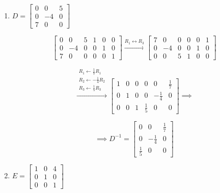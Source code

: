 \begin{enumerate}[label=\alph*)]
\item
$D=
\begin{bmatrix}
    0 & 0 & 5\\
    0 & -4 & 0\\
    7 & 0 & 0
\end{bmatrix}
$

\begin{answer}
    $$
    \left[
    \begin{array}{ccc|ccc}
        0 & 0 & 5 & 1 & 0 & 0\\
        0 & -4 & 0 & 0 & 1 & 0\\
        7 & 0 & 0 & 0 & 0 & 1
    \end{array}
    \right]
    \xrightarrow{R_1\leftrightarrow R_3}
    \left[
    \begin{array}{ccc|ccc}
        7 & 0 & 0 & 0 & 0 & 1\\
        0 & -4 & 0 & 0 & 1 & 0\\
        0 & 0 & 5 & 1 & 0 & 0
    \end{array}
    \right]
    $$

    $$
    \xrightarrow{
        \substack{
            R_1\leftarrow\frac17R_1\\
            R_2\leftarrow-\frac14R_2\\
            R_3\leftarrow\frac15R_3
        }
    }
    \left[
    \begin{array}{ccc|ccc}
        1 & 0 & 0 & 0 & 0 & \frac17\\
        0 & 1 & 0 & 0 & -\frac14 & 0\\
        0 & 0 & 1 & \frac15 & 0 & 0
    \end{array}
    \right] \implies
    $$

    $$
    \implies \boxed{
    D^{-1}=
    \begin{bmatrix}
        0 & 0 & \frac17\\
        0 & -\frac14 & 0\\
        \frac15 & 0 & 0
    \end{bmatrix}
    }
    $$
\end{answer}

\item
$E=
\begin{bmatrix}
    1 & 0 & 4\\
    0 & 1 & 0\\
    0 & 0 & 1
\end{bmatrix}
$


\end{enumerate}
